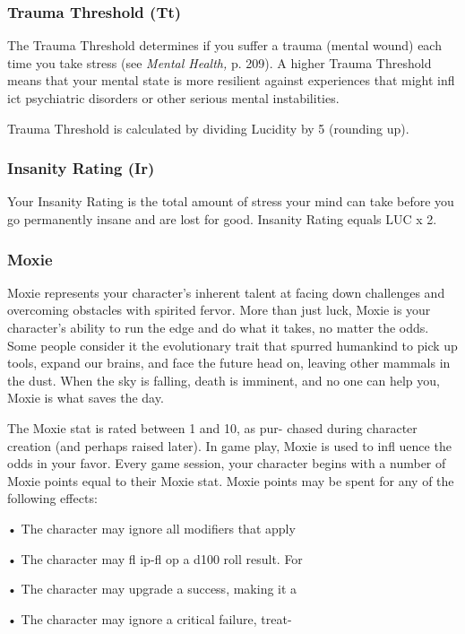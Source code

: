\subsubsection{Trauma Threshold (Tt)}

The Trauma Threshold determines if you suffer a 
trauma (mental wound) each time you take stress (see 
\textit{Mental Health,} p. 209). A higher Trauma Threshold 
means that your mental state is more resilient against 
experiences that might infl ict psychiatric disorders or 
other serious mental instabilities.

Trauma Threshold is calculated by dividing Lucidity 
by 5 (rounding up).

\subsubsection{Insanity Rating (Ir)}

Your Insanity Rating is the total amount of stress your 
mind can take before you go permanently insane and 
are lost for good. Insanity Rating equals LUC x 2.

\subsubsection{Moxie}

Moxie represents your character's inherent talent at 
facing down challenges and overcoming obstacles 
with spirited fervor. More than just luck, Moxie is 
your character's ability to run the edge and do what 
it takes, no matter the odds. Some people consider it 
the evolutionary trait that spurred humankind to pick 
up tools, expand our brains, and face the future head 
on, leaving other mammals in the dust. When the sky 
is falling, death is imminent, and no one can help you, 
Moxie is what saves the day.

The Moxie stat is rated between 1 and 10, as pur-
chased during character creation (and perhaps raised 
later). In game play, Moxie is used to infl uence the 
odds in your favor. Every game session, your character 
begins with a number of Moxie points equal to their 
Moxie stat. Moxie points may be spent for any of the 
following effects:

•  The character may ignore all modifiers that apply 

•  The character may fl ip-fl op a d100 roll result. For 

•  The character may upgrade a success, making it a 

•  The character may ignore a critical failure, treat-


